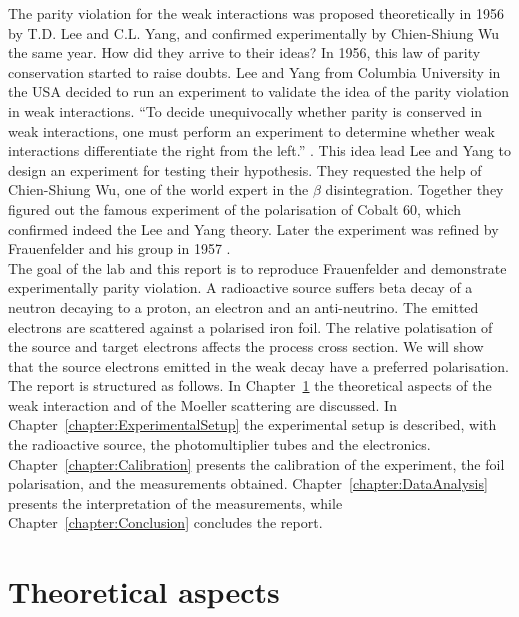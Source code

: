 \documentclass[10pt,swedish, openany]{book}
\begin{document}
The parity violation for the weak interactions was proposed theoretically in 1956 by T.D. Lee and C.L. Yang, and confirmed experimentally by Chien-Shiung Wu the same year. How did they arrive to their ideas? In 1956, this law of parity conservation started to raise doubts. Lee and Yang from Columbia University in the USA decided to run an experiment to validate the idea of the parity violation in weak interactions. ``To decide unequivocally whether parity is conserved in weak interactions, one must perform an experiment to determine whether weak interactions differentiate the right from the left.'' \cite{parity}. This idea lead Lee and Yang to design an experiment for testing their hypothesis. They requested the help of Chien-Shiung Wu, one of the world expert in the $\beta$ disintegration. Together they figured out the famous experiment of the polarisation of Cobalt 60, which confirmed indeed the Lee and Yang theory. Later the experiment was refined by Frauenfelder and his group in 1957 \cite{paritos}. \\

The goal of the lab and this report is to reproduce Frauenfelder and demonstrate experimentally parity violation. A radioactive source suffers beta decay of a neutron decaying to a proton, an electron and an anti-neutrino. The emitted electrons are scattered against a polarised iron foil. The relative polatisation of the source and target electrons affects the process cross section. We will show that the source electrons emitted in the weak decay have a preferred polarisation. \\

The report is structured as follows. In Chapter~\ref{chapter:TheoreticalAspects} the theoretical aspects of the weak interaction and of the Moeller scattering are discussed. In Chapter~\ref{chapter:ExperimentalSetup} the experimental setup is described, with the radioactive source, the photomultiplier tubes and the electronics. Chapter~\ref{chapter:Calibration} presents the calibration of the experiment, the foil polarisation, and the measurements obtained. Chapter~\ref{chapter:DataAnalysis} presents the interpretation of the measurements, while Chapter~\ref{chapter:Conclusion} concludes the report. 

\chapter{Theoretical aspects}
\label{chapter:TheoreticalAspects}

\end{document}
